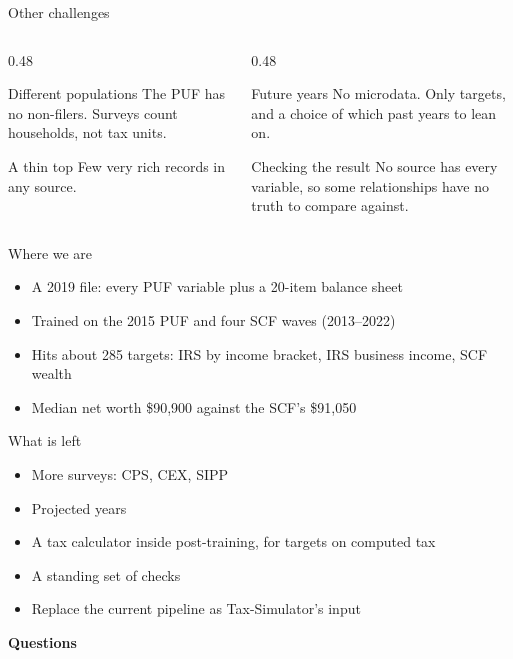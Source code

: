 \documentclass[11pt,aspectratio=169]{beamer}
\begin{document}
\begin{frame}{Other challenges}
  \begin{columns}[T]
    \begin{column}{0.48\textwidth}
      \begin{block}{Different populations}
        The PUF has no non-filers. Surveys count households, not tax units.
      \end{block}
      \begin{block}{A thin top}
        Few very rich records in any source.
      \end{block}
    \end{column}
    \begin{column}{0.48\textwidth}
      \begin{block}{Future years}
        No microdata. Only targets, and a choice of which past years to lean on.
      \end{block}
      \begin{block}{Checking the result}
        No source has every variable, so some relationships have no truth to compare against.
      \end{block}
    \end{column}
  \end{columns}
\end{frame}


\begin{frame}{Where we are}
  \begin{itemize}
    \item A 2019 file: every PUF variable plus a 20-item balance sheet
    \item Trained on the 2015 PUF and four SCF waves (2013--2022)
    \item Hits about 285 targets: IRS by income bracket, IRS business income, SCF wealth
    \item Median net worth \$90,900 against the SCF's \$91,050
  \end{itemize}
\end{frame}

\begin{frame}{What is left}
  \begin{itemize}
    \item More surveys: CPS, CEX, SIPP
    \item Projected years
    \item A tax calculator inside post-training, for targets on computed tax
    \item A standing set of checks
    \item Replace the current pipeline as Tax-Simulator's input
  \end{itemize}
\end{frame}

\begin{frame}
  \begin{center}
    {\color{yaleblue}\Large\bfseries Questions}
  \end{center}
\end{frame}
\end{document}
